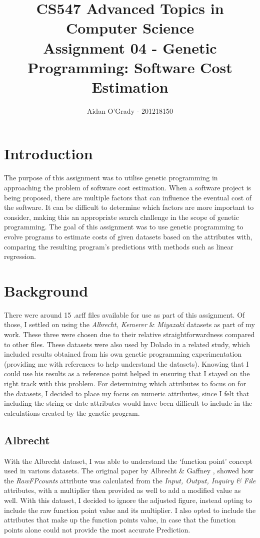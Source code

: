 \documentclass[11pt, a4paper]{article}
\begin{document}
\title{CS547 Advanced Topics in Computer Science\\
\large{Assignment 04 - Genetic Programming: Software Cost Estimation}}
\author{Aidan O'Grady - 201218150}
\date{}
\maketitle
\section{Introduction} %
\label{sec:introduction}
The purpose of this assignment was to utilise genetic programming in approaching
the problem of software cost estimation. When a software project is being
proposed, there are multiple factors that can influence the eventual cost of the
software. It can be difficult to determine which factors are more important to
consider, making this an appropriate search challenge in the scope of genetic
programming. The goal of this assignment was to use genetic programming to
evolve programs to estimate costs of given datasets based on the attributes
with, comparing the resulting program's predictions with methods such as linear
regression.

\section{Background} %
\label{sec:background}
There were around 15 .arff files available for use as part of this assignment.
Of those, I settled on using the \emph{Albrecht, Kemerer} \& \emph{Miyazaki}
datasets as part of my work. These three were chosen due to their relative
straightforwardness compared to other files. These datasets were also used by
Dolado \cite{Dolado200161} in a related study, which included results obtained
from his own genetic programming experimentation (providing me with references
to help understand the datasets). Knowing that I could use his results as a
reference point helped in ensuring that I stayed on the right track with this
problem. For determining which attributes to focus on for the datasets, I
decided to place my focus on numeric attributes, since I felt that including
the string or date attributes would have been difficult to include in the
calculations created by the genetic program.

\subsection{Albrecht} %
\label{sub:albrecht}
With the Albrecht dataset, I was able to understand the `function point' concept
used in various datasets. The original paper by Albrecht \& Gaffney
\cite{1703110}, showed how the \emph{RawFPcounts} attribute was calculated
from the \emph{Input, Output, Inquiry \& File} attributes, with a multiplier
then provided as well to add a modified value as well. With this dataset, I
decided to ignore the adjusted figure, instead opting to include the raw
function point value and its multiplier. I also opted to include the attributes
that make up the function points value, in case that the function points alone
could not provide the most accurate Prediction.
\end{document}
